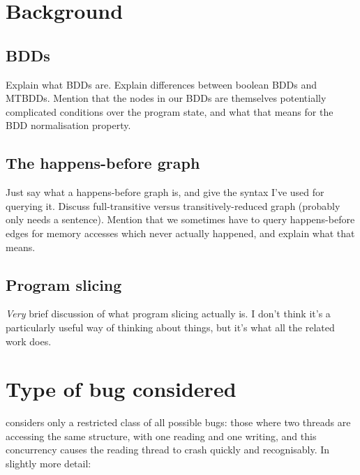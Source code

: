 \section{Background}
\subsection{BDDs}

Explain what BDDs are.  Explain differences between boolean BDDs and
MTBDDs.  Mention that the nodes in our BDDs are themselves potentially
complicated conditions over the program state, and what that means for
the BDD normalisation property.

\subsection{The happens-before graph}

Just say what a happens-before graph is, and give the syntax I've used
for querying it.  Discuss full-transitive versus transitively-reduced
graph (probably only needs a sentence).  Mention that we sometimes
have to query happens-before edges for memory accesses which never
actually happened, and explain what that means.

\subsection{Program slicing}

\emph{Very} brief discussion of what program slicing actually is.  I
don't think it's a particularly useful way of thinking about things,
but it's what all the related work does.

\section{Type of bug considered}
\label{sect:intro:types_of_bugs}

{\Technique} considers only a restricted class of all possible bugs:
those where two threads are accessing the same structure, with one
reading and one writing, and this concurrency causes the reading
thread to crash quickly and recognisably.  In slightly more detail:

